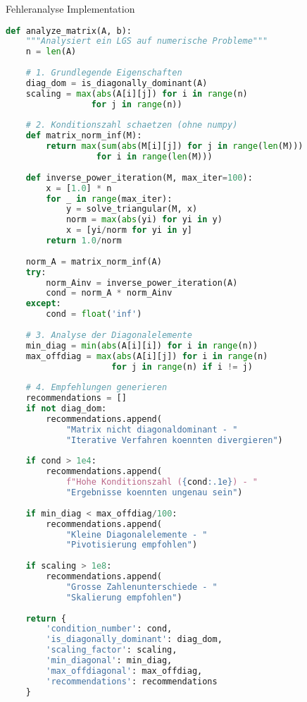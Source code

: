 \begin{examplecode}{Fehleranalyse Implementation}
\begin{lstlisting}[language=Python, style=basesmol]
def analyze_matrix(A, b):
    """Analysiert ein LGS auf numerische Probleme"""
    n = len(A)
    
    # 1. Grundlegende Eigenschaften
    diag_dom = is_diagonally_dominant(A)
    scaling = max(abs(A[i][j]) for i in range(n) 
                 for j in range(n))
    
    # 2. Konditionszahl schaetzen (ohne numpy)
    def matrix_norm_inf(M):
        return max(sum(abs(M[i][j]) for j in range(len(M))) 
                  for i in range(len(M)))
    
    def inverse_power_iteration(M, max_iter=100):
        x = [1.0] * n
        for _ in range(max_iter):
            y = solve_triangular(M, x)
            norm = max(abs(yi) for yi in y)
            x = [yi/norm for yi in y]
        return 1.0/norm
    
    norm_A = matrix_norm_inf(A)
    try:
        norm_Ainv = inverse_power_iteration(A)
        cond = norm_A * norm_Ainv
    except:
        cond = float('inf')
    
    # 3. Analyse der Diagonalelemente
    min_diag = min(abs(A[i][i]) for i in range(n))
    max_offdiag = max(abs(A[i][j]) for i in range(n) 
                     for j in range(n) if i != j)
    
    # 4. Empfehlungen generieren
    recommendations = []
    if not diag_dom:
        recommendations.append(
            "Matrix nicht diagonaldominant - "
            "Iterative Verfahren koennten divergieren")
    
    if cond > 1e4:
        recommendations.append(
            f"Hohe Konditionszahl ({cond:.1e}) - "
            "Ergebnisse koennten ungenau sein")
    
    if min_diag < max_offdiag/100:
        recommendations.append(
            "Kleine Diagonalelemente - "
            "Pivotisierung empfohlen")
    
    if scaling > 1e8:
        recommendations.append(
            "Grosse Zahlenunterschiede - "
            "Skalierung empfohlen")
    
    return {
        'condition_number': cond,
        'is_diagonally_dominant': diag_dom,
        'scaling_factor': scaling,
        'min_diagonal': min_diag,
        'max_offdiagonal': max_offdiag,
        'recommendations': recommendations
    }


\end{lstlisting}
\end{examplecode}
